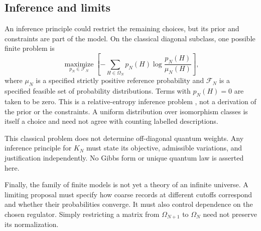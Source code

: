 
\subsection{Inference and limits}
\label{sec:inference}

An inference principle could restrict the remaining choices, but its prior
and constraints are part of the model. On the classical diagonal subclass,
one possible finite problem is
\[
  \underset{p_N\in\mathcal F_N}{\operatorname{maximize}}
  \left[-\sum_{H\in\Omega_N}p_N(H)
  \log\frac{p_N(H)}{\mu_N(H)}\right],
\]
where $\mu_N$ is a specified strictly positive reference probability and
$\mathcal F_N$ is a specified feasible set of probability distributions.
Terms with $p_N(H)=0$ are taken to be zero. This is a relative-entropy
inference problem \citep{jaynes1957}, not a derivation of the prior or the
constraints. A uniform distribution over isomorphism classes is itself a
choice and need not agree with counting labelled descriptions.

This classical problem does not determine off-diagonal quantum weights.
Any inference principle for $K_N$ must state its objective, admissible
variations, and justification independently. No Gibbs form or unique
quantum law is asserted here.

Finally, the family of finite models is not yet a theory of an infinite
universe. A limiting proposal must specify how coarse records at different
cutoffs correspond and whether their probabilities converge. It must also
control dependence on the chosen regulator. Simply restricting a matrix
from $\Omega_{N+1}$ to $\Omega_N$ need not preserve its normalization.

